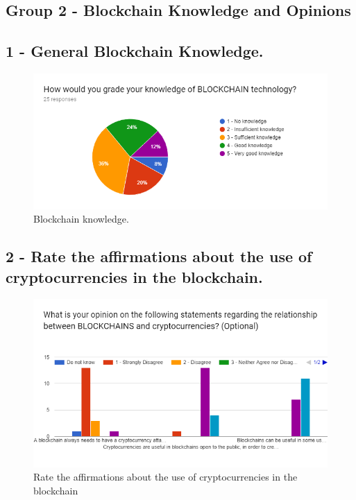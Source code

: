 
\subsection{Group 2 - Blockchain Knowledge and Opinions}

\subsection*{1 - General Blockchain Knowledge.}
 \begin{figure}[h]
\centering
\includegraphics[scale=0.65]{media/blockchain_knowledge.png}
\caption["Blockchain knowledge."]{Blockchain knowledge.}
\label{fig:blockchain_knowledge}
\end{figure}
 
 
\subsection*{2 - Rate the affirmations about the use of cryptocurrencies in the blockchain.}

\begin{figure}[h]
\centering
\includegraphics[scale=0.60]{media/blockchain_crypto_opinions.png}
\caption[Rate the affirmations about the use of cryptocurrencies in the blockchain]{Rate the affirmations about the use of cryptocurrencies in the blockchain}
\label{fig:blockchain_crypto_opinions}
\end{figure}


